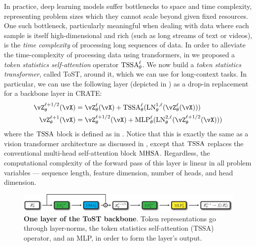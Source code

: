 \documentclass[../../book-main.tex]{subfiles}
\begin{document}
In practice, deep learning models suffer bottlenecks to space and time complexity, representing problem sizes which they cannot scale beyond given fixed resources. One such bottleneck, particularly meaningful when dealing with data where each sample is itself high-dimensional and rich (such as long streams of text or videos), is the \textit{time complexity} of processing long sequences of data. In order to alleviate the time-complexity of processing data using transformers, in  we proposed a \textit{token statistics self-attention} operator \(\operatorname{TSSA}_{\theta}^{\ell}\). We now build a \textit{token statistics transformer}, called ToST, around it, which we can use for long-context tasks. In particular, we can use the following layer (depicted in ) as a drop-in replacement for a backbone layer in CRATE:
\begin{align}
    \vZ_{\theta}^{\ell + 1/2}(\vX)
    &= \vZ_{\theta}^{\ell}(\vX) + \TSSA_{\theta}^{\ell}(\LN_{\theta}^{1, \ell}(\vZ_{\theta}^{\ell}(\vX))) \\ 
    \vZ_{\theta}^{\ell + 1}(\vX)
    &= \vZ_{\theta}^{\ell + 1/2}(\vX) + \MLP_{\theta}^{\ell}(\LN_{\theta}^{2, \ell}(\vZ_{\theta}^{\ell + 1/2}(\vX)))
\end{align}
where the \(\operatorname{TSSA}\) block is defined as in . Notice that this is exactly the same as a vision transformer architecture as discussed in , except that \(\operatorname{TSSA}\) replaces the conventional multi-head self-attention block \(\operatorname{MHSA}\). Regardless, the computational complexity of the forward pass of this layer is linear in all problem variables --- sequence length, feature dimension, number of heads, and head dimension.

\begin{figure}
    \centering 
    \includegraphics[width=\textwidth]{figs_chap7/tost_backbone.pdf}
    \caption{\small\textbf{One layer of the ToST backbone}. Token representations go through layer-norms, the token statistics self-attention (TSSA) operator, and an MLP, in order to form the layer's output.}
    \label{fig:tost_backbone}
\end{figure}
\end{document}
